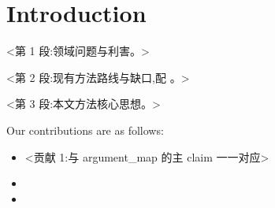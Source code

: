 \section{Introduction}\label{sec:intro}

<第 1 段:领域问题与利害。>

<第 2 段:现有方法路线与缺口,配 \cite{...}。>

<第 3 段:本文方法核心思想。>

Our contributions are as follows:
\begin{itemize}
  \item <贡献 1:与 argument_map 的主 claim 一一对应>
  \item <贡献 2>
  \item <贡献 3>
\end{itemize}
